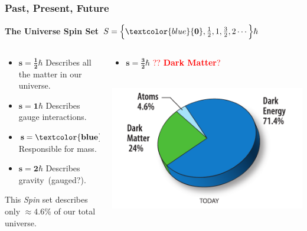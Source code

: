\documentclass{beamer}
\begin{document}
\begin{frame}
\frametitle{\Huge{Past, Present, Future}}
  \begin{minipage}[b]{0.65\paperwidth}
     \begin{varblock}[6.5cm]{\textbf{\huge{The Universe  Spin Set}}}
     \huge{
       $S =\Big\{\textcolor{blue}{\mathbf{0}}, \frac{1}{2}, 1,  \frac{3}{2}, 2  \cdots \Big\} \hbar $ 
       }
     \end{varblock}
 \end{minipage}
\begin{minipage}[b]{0.70\paperwidth}
 \begin{columns}
    \begin{column}{0.65\linewidth} 
     \begin{itemize}
     \item $\mathbf{s = \frac{1}{2}\hbar}$ Describes all the matter in our universe.
     \item $\mathbf{s = 1\hbar}$ Describes gauge interactions.
     \item $\mathbf{s = \textcolor{blue}{0}\hbar}$ Responsible for mass.
     \item $\mathbf{s = 2\hbar}$ Describes gravity~(gauged?).
    
    \end{itemize}
    This \textit{Spin} set describes  only $\approx 4.6$\% of our total universe.
   \end{column}
     \begin{column}{0.45\linewidth}
      \begin{itemize}
       \item $\mathbf{s = \frac{3}{2}\hbar}$ \textcolor{red}{?? \textbf{Dark Matter}?}
      \end{itemize}
    \mbox{
    \includegraphics[height=0.65\textwidth,width=0.45\paperwidth]      {THESISPLOTS/WMAPUniversePie.pdf}}
    \end{column}
\end{columns}
\end{minipage}
\end{frame}
\end{document}

